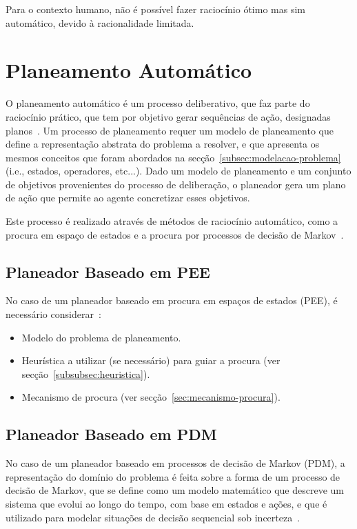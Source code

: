 Para o contexto humano, não é possível fazer raciocínio ótimo mas sim automático, devido à racionalidade limitada.


\section{Planeamento Automático}\label{sec:planeamento-automatico}

O planeamento automático é um processo deliberativo, que faz parte do raciocínio prático,
que tem por objetivo
gerar sequências de ação, designadas planos~\cite{isel:iasa:slides:plan-autom-pee}.
Um processo de planeamento requer um modelo de planeamento que define a representação abstrata do problema a resolver, e que apresenta os mesmos conceitos que foram abordados na secção~\ref{subsec:modelacao-problema} (i.e., estados, operadores, etc...).
Dado um modelo de planeamento e um conjunto de objetivos provenientes do processo de deliberação, o planeador gera um plano de ação que permite ao agente concretizar esses objetivos.

Este processo é realizado através de métodos de raciocínio automático, como a procura em
espaço de estados e a procura por processos de decisão de Markov~\cite{isel:iasa:slides:plan-autom-pee}.

\subsection{Planeador Baseado em PEE}\label{subsec:planeador-baseado-em-pee}

No caso de um planeador baseado em procura em espaços de estados (PEE), é necessário considerar~\cite{isel:iasa:slides:plan-autom-pee}:

\begin{itemize}
    \item Modelo do problema de planeamento.
    \item Heurística a utilizar (se necessário) para guiar a procura (ver secção~\ref{subsubsec:heuristica}).
    \item Mecanismo de procura (ver secção~\ref{sec:mecanismo-procura}).
\end{itemize}

\subsection{Planeador Baseado em PDM}\label{subsec:planeador-baseado-em-pdm}

No caso de um planeador baseado em processos de decisão de Markov (PDM), a representação do domínio do problema é feita sobre a forma de um processo de decisão de Markov, que se define como um modelo matemático que descreve um sistema que evolui ao longo do tempo, com base em estados e ações, e que é utilizado para modelar situações de decisão sequencial sob incerteza~\cite{isel:iasa:slides:plan-autom-pdm}.


